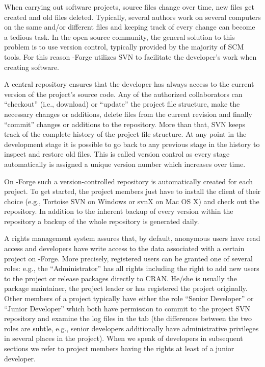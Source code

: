 When carrying out software projects, source files change over time,
new files get created and old files deleted. Typically, several authors
work on several computers on the same and/or different files and keeping
track of every change can become a tedious task. In the open source
community, the general solution to this problem is to use version
control, typically 
provided by the majority of SCM tools. For this reason \R{}-Forge
utilizes SVN to facilitate the developer's work when creating
software.

A central repository ensures that the developer
has always access to the current version of the project's source
code. Any of the authorized collaborators can ``checkout''
(i.e., download) or ``update'' the project
file structure, make the necessary changes or additions, delete
files from the current revision and finally ``commit'' changes or
additions to the repository. More than
that, SVN keeps track of the complete history of the project file
structure. At any point in the development stage it is possible to go
back to any previous stage in the history to inspect and restore old
files. This is called version control as every stage automatically is
assigned a unique version number which increases over time. 

On \R{}-Forge such a version-controlled repository is automatically
created for each project. To get started, the project members just
have to install the client of their choice (e.g., Tortoise SVN on
Windows or svnX on 
Mac OS X) and check out the repository. In addition to the inherent
backup of every version within the repository a backup of the whole
repository is generated daily. 

A rights management system assures that, by default, anonymous users
have read access and developers have write access to the data associated with 
a certain project on \R{}-Forge. More precisely, registered users can
be granted one of several roles: e.g., the ``Administrator'' has
all rights including the right to 
add new users to the project or release packages directly to CRAN.
He/she is usually the package 
maintainer, the project leader or has registered the project originally.
Other members of a project typically have either the role ``Senior 
Developer'' or ``Junior Developer'' which both have permission to
commit to the project SVN repository and examine the log files in the 
 tab (the differences between the two
roles are subtle, e.g., senior developers additionally have administrative
privileges in several places in the project).  
When we speak of developers in subsequent sections we refer to project
members having the rights at least of a junior developer.


